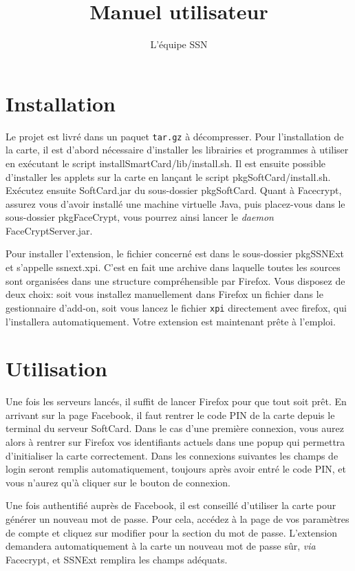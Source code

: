 \documentclass[a4paper,10pt]{article}
\title{Manuel utilisateur}
\author{L'équipe SSN}
\begin{document}
\maketitle
\tableofcontents

\section{Installation}

Le projet est livré dans un paquet \texttt{tar.gz} à décompresser. Pour
l'installation de la carte, il est d'abord nécessaire d'installer les librairies
et programmes à utiliser en exécutant le script installSmartCard/lib/install.sh.
Il est ensuite possible d'installer les applets sur la carte en lançant le
script pkgSoftCard/install.sh. Exécutez ensuite SoftCard.jar du sous-dossier 
pkgSoftCard. Quant à Facecrypt, assurez vous d'avoir installé une machine virtuelle 
Java, puis placez-vous dans le sous-dossier pkgFaceCrypt, vous pourrez ainsi lancer
le \emph{daemon} FaceCryptServer.jar.

Pour installer l'extension, le fichier concerné est dans le sous-dossier
pkgSSNExt et s'appelle ssnext.xpi. C'est en fait une archive dans laquelle
toutes les sources sont organisées dans une structure compréhensible par
Firefox. Vous disposez de deux choix: soit vous installez manuellement dans Firefox
un fichier dans le gestionnaire d'add-on, soit vous lancez 
le fichier \texttt{xpi} directement avec firefox, qui l'installera 
automatiquement. Votre extension est maintenant prête à l'emploi. 


\section{Utilisation}

Une fois les serveurs lancés, il suffit de lancer Firefox pour que
tout soit prêt. En arrivant sur la page Facebook, il faut rentrer le
code PIN de la carte depuis le terminal du serveur SoftCard. Dans le
cas d'une première connexion, vous aurez alors à rentrer sur Firefox vos identifiants 
actuels dans une popup qui permettra d'initialiser la carte correctement.
Dans les connexions suivantes les champs de login seront remplis
automatiquement, toujours après avoir entré le code PIN, et vous n'aurez qu'à 
cliquer sur le bouton de connexion.

Une fois authentifié auprès de Facebook, il est conseillé d'utiliser la carte
pour générer un nouveau mot de passe. Pour cela, accédez à la page de vos 
paramètres de compte et cliquez sur \og modifier \fg{} pour la section du mot 
de passe. L'extension demandera automatiquement à la carte un nouveau mot de 
passe sûr, \emph{via} Facecrypt, et SSNExt remplira les champs adéquats.
\end{document}
